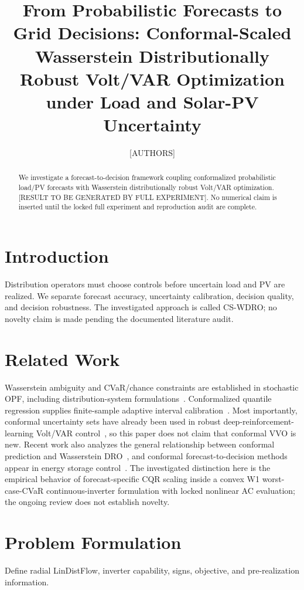 \documentclass[10pt]{article}
\title{From Probabilistic Forecasts to Grid Decisions: Conformal-Scaled Wasserstein
Distributionally Robust Volt/VAR Optimization under Load and Solar-PV Uncertainty}
\author{[AUTHORS]}
\date{}
\begin{document}
\maketitle

\begin{abstract}
We investigate a forecast-to-decision framework coupling conformalized probabilistic
load/PV forecasts with Wasserstein distributionally robust Volt/VAR optimization.
[RESULT TO BE GENERATED BY FULL EXPERIMENT]. No numerical claim is inserted until the
locked full experiment and reproduction audit are complete.
\end{abstract}

\section{Introduction}
Distribution operators must choose controls before uncertain load and PV are realized. We
separate forecast accuracy, uncertainty calibration, decision quality, and decision robustness.
The investigated approach is called CS-WDRO; no novelty claim is made pending the documented
literature audit.

\section{Related Work}
Wasserstein ambiguity and CVaR/chance constraints are established in stochastic OPF,
including distribution-system formulations~\cite{guo2018stochasticopf,guo2018partone,
duan2018wassersteinopf}. Conformalized quantile regression supplies finite-sample adaptive
interval calibration~\cite{romano2019cqr}. Most importantly, conformal uncertainty sets have
already been used in robust deep-reinforcement-learning Volt/VAR control~\cite{chen2024robustvvo},
so this paper does not claim that conformal VVO is new. Recent work also analyzes the general
relationship between conformal prediction and Wasserstein DRO~\cite{long2026unified}, and
conformal forecast-to-decision methods appear in energy storage control~\cite{wu2026arbitrage}.
The investigated distinction here is the empirical behavior of forecast-specific CQR scaling
inside a convex W1 worst-case-CVaR continuous-inverter formulation with locked nonlinear AC
evaluation; the ongoing review does not establish novelty.

\section{Problem Formulation}
Define radial LinDistFlow, inverter capability, signs, objective, and pre-realization information.
\end{document}
